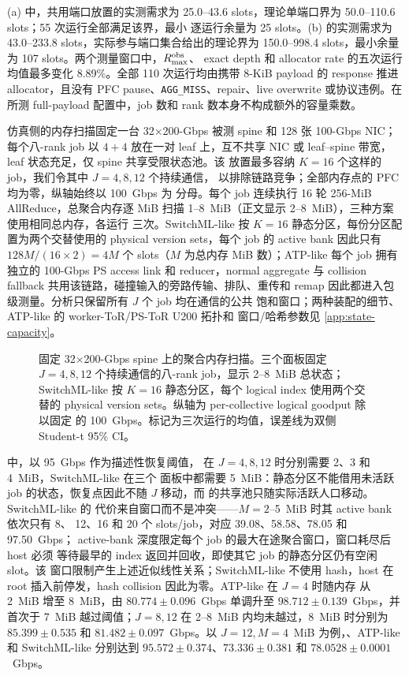 (a) 中，共用端口放置的实测需求为 25.0--43.6
slots，理论单端口界为 50.0--110.6 slots；55 次运行全部满足该界，最小
逐运行余量为 25 slots。(b) 的实测需求为
43.0--233.8 slots，实际参与端口集合给出的理论界为 150.0--998.4
slots，最小余量为 107 slots。两个测量窗口中，$R_{\max}^{\rm obs}$、
exact depth 和 allocator rate 的五次运行均值最多变化 8.89\%。全部
110 次运行均由携带 8-KiB payload 的 response 推进 allocator，且没有
PFC pause、\texttt{AGG\_MISS}、repair、live overwrite 或协议违例。在
所测 full-payload 配置中，job 数和 rank 数本身不构成额外的容量乘数。

仿真侧的内存扫描固定一台 32$\times$200-Gbps 被测 spine 和 128 张
100-Gbps NIC；每个八-rank job 以 $4+4$ 放在一对 leaf 上，互不共享
NIC 或 leaf--spine 带宽，leaf 状态充足，仅 spine 共享受限状态池。该
放置最多容纳 $K=16$ 个这样的 job，我们令其中 $J=4,8,12$ 个持续通信，
以排除链路竞争；全部内存点的 PFC 均为零，纵轴始终以 100~Gbps 为
分母。每个 job 连续执行 16 轮 256-MiB AllReduce，总聚合内存逐 MiB
扫描 1--8~MiB（正文显示 2--8~MiB），三种方案使用相同总内存，各运行
三次。SwitchML-like 按 $K=16$ 静态分区，每份分区配置为两个交替使用的
physical version sets，每个 job 的 active bank 因此只有
$128M/(16\times2)=4M$ 个 slots（$M$ 为总内存 MiB 数）；ATP-like 每个
job 拥有独立的 100-Gbps PS access link 和 reducer，normal aggregate
与 collision fallback 共用该链路，碰撞输入的旁路传输、排队、重传和
remap 因此都进入包级测量。分析只保留所有 $J$ 个 job 均在通信的公共
饱和窗口；两种装配的细节、ATP-like 的 worker-ToR/PS-ToR U200 拓扑和
窗口/哈希参数见 \cref{app:state-capacity}。

\begin{figure}[t]
\centering

\caption{固定 32$\times$200-Gbps spine 上的聚合内存扫描。三个面板固定
$J=4,8,12$ 个持续通信的八-rank job，显示 2--8~MiB 总状态；
SwitchML-like 按 $K=16$ 静态分区，每个 logical index 使用两个交替的
physical version sets。纵轴为 per-collective logical goodput 除以固定
的 100~Gbps。标记为三次运行的均值，误差线为双侧 Student-t 95\% CI。}
\label{fig:multitenant-memory}
\end{figure}

 中，以 95~Gbps 作为描述性恢复阈值，
\sysname 在 $J=4,8,12$ 时分别需要 2、3 和 4~MiB，SwitchML-like 在三个
面板中都需要 5~MiB：静态分区不能借用未活跃 job 的状态，恢复点因此不随
$J$ 移动，而 \sysname 的共享池只随实际活跃人口移动。SwitchML-like 的
代价来自窗口而不是冲突——$M=2$--5~MiB 时其 active bank 依次只有 8、
12、16 和 20 个 slots/job，对应 39.08、58.58、78.05 和 97.50~Gbps；
active-bank 深度限定每个 job 的最大在途聚合窗口，窗口耗尽后 host 必须
等待最早的 index 返回并回收，即使其它 job 的静态分区仍有空闲 slot。该
窗口限制产生上述近似线性关系；SwitchML-like 不使用 hash，host 在
root 插入前停发，hash collision 因此为零。ATP-like 在 $J=4$ 时随内存
从 2~MiB 增至 8~MiB，由 $80.774\pm0.096$~Gbps 单调升至
$98.712\pm0.139$~Gbps，并首次于 7~MiB 越过阈值；$J=8,12$ 在 2--8~MiB
内均未越过，8~MiB 时分别为 $85.399\pm0.535$ 和
$81.482\pm0.097$~Gbps。以 $J=12,M=4$~MiB 为例，\sysname、ATP-like 和
SwitchML-like 分别达到 $95.572\pm0.374$、$73.336\pm0.381$ 和
$78.0528\pm0.0001$~Gbps。

